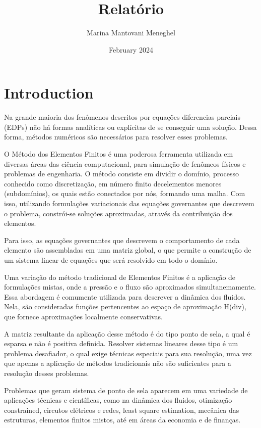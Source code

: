 \documentclass[12pt]{article}
\title{Relatório}
\author{Marina Mantovani Meneghel}
\date{February 2024}
\begin{document}
\maketitle

\section{Introduction}

Na grande maioria dos fenômenos descritos por equações diferencias parciais (EDPs) não há formas analíticas ou explícitas de se 
conseguir uma solução. Dessa forma, métodos numéricos são necessários para resolver esses problemas.

O Método dos Elementos Finitos é uma poderosa ferramenta utilizada em diversas áreas das ciência computacional, para simulação de 
fenômeos físicos e problemas de engenharia. O método consiste em dividir o domínio, processo conhecido como discretização, em número 
finito decelementos menores (subdomínios), os quais estão conectados por nós, formando uma malha. Com isso, utilizando formulações 
variacionais das equações governantes que descrevem o problema, constrói-se soluções aproximadas, através da contribuição dos elementos.

Para isso, as equações governantes que descrevem o comportamento de cada elemento são assembladas em uma matriz global, o que permite 
a construção de um sistema linear de equações que será resolvido em todo o domínio.

Uma variação do método tradicional de Elementos Finitos é a aplicação de formulações mistas, onde a pressão e o fluxo são aproximados 
simultanemamente. Essa abordagem é comumente utilizada para descrever a dinâmica dos fluidos. Nela, são consideradas funções pertencentes
ao espaço de aproximação H(div), que fornece aproximações localmente conservativas. 

A matriz resultante da aplicação desse método é do tipo ponto de sela, a qual é esparsa e não é positiva definida. Resolver sistemas
lineares desse tipo é um problema desafiador, o qual exige técnicas especiais para sua resolução, uma vez que apenas a aplicação de 
métodos tradicionais não são suficientes para a resolução desses problemas.

Problemas que geram sistema de ponto de sela aparecem em uma variedade de aplicações técnicas e científicas, como na dinâmica dos fluidos, 
otimização constrained, circutos elétricos e redes, least square estimation, mecânica das estruturas, elementos finitos mistos, até em áreas 
da economia e de finanças.
\end{document}
